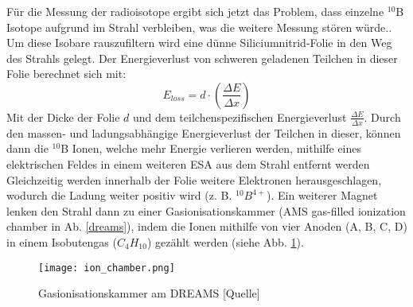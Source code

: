 Für die Messung der radioisotope ergibt sich jetzt das Problem, dass einzelne $^{10}$B Isotope aufgrund im Strahl verbleiben, was die weitere Messung stören würde..
Um diese Isobare rauszufiltern wird eine dünne Siliciumnitrid-Folie in den Weg des Strahls gelegt.
Der Energieverlust von schweren geladenen Teilchen in dieser Folie berechnet sich mit:
\begin{equation}
E_{loss} = d \cdot \left( \frac{\Delta E}{\Delta x} \right)
\end{equation}
Mit der Dicke der Folie $d$ und dem teilchenspezifischen Energieverlust $\frac{\Delta E}{\Delta x}$.
Durch den massen- und ladungsabhängige Energieverlust der Teilchen in dieser, können dann die $^{10}$B Ionen, welche mehr Energie verlieren werden, mithilfe eines elektrischen Feldes in einem weiteren ESA aus dem Strahl entfernt werden
Gleichzeitig werden innerhalb der Folie weitere Elektronen herausgeschlagen, wodurch die Ladung weiter positiv wird (z. B. $^{10}B^{4+}$).
Ein weiterer Magnet lenken den Strahl dann zu einer Gasionisationskammer (AMS gas-filled ionization chamber in Ab. \ref{dreams}), indem die Ionen mithilfe von vier Anoden (A, B, C, D) in einem Isobutengas ($C_{4}H_{10}$) gezählt werden (siehe Abb. \ref{ion_chamber}).
\begin{figure}[ht]
  \texttt{[image: ion\_chamber.png]}
  \caption{Gasionisationskammer am DREAMS [Quelle]}
  \label{ion_chamber}
\end{figure}
\clearpage
